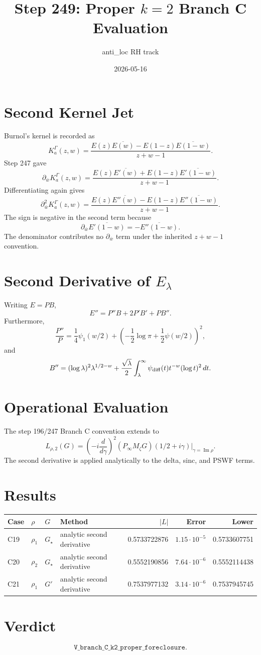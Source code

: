 \documentclass[11pt]{article}
\title{Step 249: Proper \(k=2\) Branch C Evaluation}
\author{anti\_loc RH track}
\date{2026-05-16}
\begin{document}
\maketitle

\section{Second Kernel Jet}

Burnol's kernel is recorded as
\[
K_a^\Gamma(z,w)=
\frac{E(z)\overline{E(w)}-E(1-z)\overline{E(1-w)}}{z+w-1}.
\]
Step 247 gave
\[
\partial_{\bar w}K_a^\Gamma(z,w)=
\frac{E(z)\overline{E'(w)}+E(1-z)\overline{E'(1-w)}}{z+w-1}.
\]
Differentiating again gives
\[
\partial_{\bar w}^2K_a^\Gamma(z,w)=
\frac{E(z)\overline{E''(w)}-E(1-z)\overline{E''(1-w)}}{z+w-1}.
\]
The sign is negative in the second term because
\[
\partial_{\bar w}\overline{E'(1-w)}=-\overline{E''(1-w)}.
\]
The denominator contributes no \(\partial_{\bar w}\) term under the inherited \(z+w-1\) convention.

\section{Second Derivative of \(E_\lambda\)}

Writing \(E=PB\),
\[
E''=P''B+2P'B'+PB''.
\]
Furthermore,
\[
\frac{P''}{P}
=\frac14\psi_1(w/2)
+\left(-\frac12\log\pi+\frac12\psi(w/2)\right)^2,
\]
and
\[
B''=(\log\lambda)^2\lambda^{1/2-w}
+\frac{\sqrt\lambda}{2}\int_\lambda^\infty
\psi_{\rm diff}(t)t^{-w}(\log t)^2\,dt.
\]

\section{Operational Evaluation}

The step 196/247 Branch C convention extends to
\[
L_{\rho,2}(G)=
\left(-i\frac{d}{d\gamma}\right)^2
\left(P_\infty M_\zeta G\right)(1/2+i\gamma)
\bigg|_{\gamma=\operatorname{Im}\rho}.
\]
The second derivative is applied analytically to the delta, sinc, and PSWF terms.

\section{Results}

\begin{center}
\begin{tabular}{llllrrr}
\toprule
Case & \(\rho\) & \(G\) & Method & \(|L|\) & Error & Lower\\
\midrule
C19 & \(\rho_1\) & \(G_\star\) & analytic second derivative & 0.5733722876 & \(1.15\cdot10^{-5}\) & 0.5733607751\\
C20 & \(\rho_2\) & \(G_\star\) & analytic second derivative & 0.5552190856 & \(7.64\cdot10^{-6}\) & 0.5552114438\\
C21 & \(\rho_1\) & \(G'\) & analytic second derivative & 0.7537977132 & \(3.14\cdot10^{-6}\) & 0.7537945745\\
\bottomrule
\end{tabular}
\end{center}

\section{Verdict}

\[
\texttt{V\_branch\_C\_k2\_proper\_foreclosure}.
\]
\end{document}
